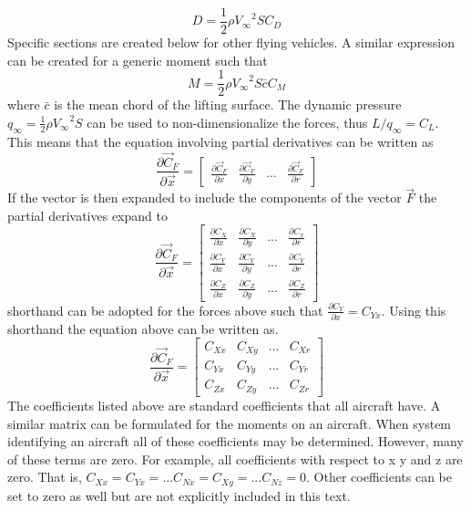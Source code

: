 \begin{equation}
D = \frac{1}2\rho {V_{\infty}}^2 S C_D
\end{equation}
Specific sections are created below for other flying vehicles. A similar expression can be created for a
generic moment such that
\begin{equation}
M = \frac{1}2\rho {V_{\infty}}^2 S \bar{c} C_M
\end{equation}
where $\bar{c}$ is the mean chord of the lifting surface. The dynamic pressure $q_{\infty} =
\frac{1}2\rho {V_{\infty}}^2 S$ can be used to non-dimensionalize the forces, thus $L/q_{\infty} = C_L$. This means
that the equation involving partial derivatives can be written as
\begin{equation}
\frac{\partial \vec{C}_F}{\partial \vec{x}} = \begin{bmatrix} \frac{\partial
    \vec{C}_F}{\partial x} & \frac{\partial \vec{C}_F}{\partial y} & ... &
  \frac{\partial \vec{C}_F}{\partial r} \end{bmatrix}
\end{equation}
If the vector is then expanded to include the components of the vector
$\vec{F}$ the partial derivatives expand to
\begin{equation}
\frac{\partial \vec{C}_F}{\partial \vec{x}} = \begin{bmatrix}
  \frac{\partial C_X}{\partial x} & \frac{\partial C_X}{\partial y} &
  ... & \frac{\partial C_x}{\partial r} \\ \frac{\partial C_Y}{\partial x} & \frac{\partial C_Y}{\partial y} &
  ... & \frac{\partial C_Y}{\partial r} \\ \frac{\partial C_Z}{\partial x} & \frac{\partial C_Z}{\partial y} &
  ... & \frac{\partial C_Z}{\partial r} \end{bmatrix}
\end{equation}
shorthand can be adopted for the forces above such that
$\frac{\partial C_Y}{\partial x} = C_{Yx}$. Using this shorthand the
equation above can be written as.
\begin{equation}
\frac{\partial \vec{C}_F}{\partial \vec{x}} = \begin{bmatrix}
  C_{Xx} & C_{Xy} &
  ... & C_{Xr} \\ C_{Yx} & C_{Yy} &
  ... & C_{Yr} \\ C_{Zx} & C_{Zy} &
  ... & C_{Zr} \end{bmatrix}
\end{equation}
The coefficients listed above are standard coefficients that all
aircraft have. A similar matrix can be formulated for the moments on
an aircraft. When system identifying an aircraft all of these
coefficients may be determined. However, many of these terms are
zero. For example, all coefficients with respect to x y and z are
zero. That is, $C_{Xx} = C_{Yx} = ... C_{Nx} = C_{Xy} = ... C_{Nz} =
0$. Other coefficients can be set to zero as well but are not explicitly included in this text.

